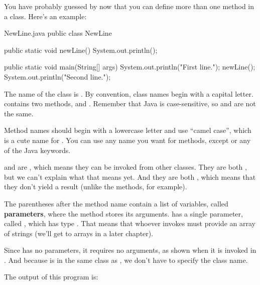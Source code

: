 
You have probably guessed by now that you can define more than one method in a class.
Here's an example:

\begin{trinket}[310]{NewLine.java}
public class NewLine {

    public static void newLine() {
        System.out.println();
    }

    public static void main(String[] args) {
        System.out.println("First line.");
        newLine();
        System.out.println("Second line.");
    }
}
\end{trinket}


The name of the class is .
By convention, class names begin with a capital letter.
 contains two methods,  and .
Remember that Java is case-sensitive, so  and  are not the same.


Method names should begin with a lowercase letter and use ``camel case'', which is a cute name for .
You can use any name you want for methods, except  or any of the Java keywords.


 and  are , which means they can be invoked from other classes.
They are both , but we can't explain what that means yet.
And they are both , which means that they don't yield a result (unlike the  methods, for example).


The parentheses after the method name contain a list of variables, called {\bf parameters}, where the method stores its arguments.
 has a single parameter, called , which has type .
That means that whoever invokes  must provide an array of strings (we'll get to arrays in a later chapter).

Since  has no parameters, it requires no arguments, as shown when it is invoked in .
And because  is in the same class as , we don't have to specify the class name.

The output of this program is:

